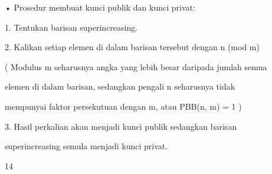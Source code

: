 \documentclass{article}
\begin{document}

• Prosedur membuat kunci publik dan kunci privat:

1. Tentukan barisan superincreasing.

2. Kalikan setiap elemen di dalam barisan tersebut dengan n (mod m)


( Modulus m seharusnya angka yang lebih besar daripada jumlah semua 

elemen di dalam barisan, sedangkan pengali n seharusnya tidak 

mempunyai faktor persekutuan dengan m, atau PBB(n, m) = 1 )

3. Hasil perkalian akan menjadi kunci publik sedangkan barisan 

superincreasing semula menjadi kunci privat.

14
\end{document}
